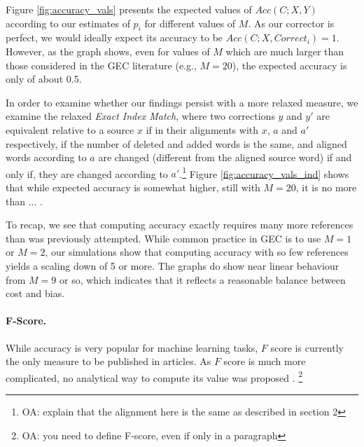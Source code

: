 \documentclass[english]{article}
\newcommand{\oa}[1]{\footnote{\color{red}OA: #1}}
\begin{document}
 Figure \ref{fig:accuracy_vals} presents the expected values of $Acc(C;X,Y)$ according to our estimates of $p_i$ for
 different values of $M$. As our corrector is perfect, we would ideally expect its accuracy to be
 $Acc(C;X,Correct_i) = 1$. However, as the graph shows, even for values of $M$ which are much larger than
 those considered in the GEC literature (e.g., $M=20$), the expected accuracy is only of about 0.5. 
 
 In order to examine whether our findings persist with a more relaxed measure, we examine the relaxed
 {\it Exact Index Match}, where two corrections $y$ and $y'$
 are equivalent relative to a source $x$ if in their alignments with $x$, $a$ and $a'$ respectively,
 if the number of deleted and added words is the same, and aligned words according to $a$ are
 changed (different from the aligned source word) if and only if, they are changed according to $a'$.\oa{
   explain that the alignment here is the same as described in section 2} Figure \ref{fig:accuracy_vals_ind}
 shows that while expected accuracy is somewhat higher, still with $M=20$, it is no more than ... .
 
 To recap, we see that computing accuracy exactly requires many more references than was previously attempted.
 While common practice in GEC is to use $M=1$ or $M=2$, our simulations show that computing accuracy with
 so few references yields a scaling down of 5 or more. The graphs do show near linear behaviour from $M=9$ or
 so, which indicates that it reflects a reasonable balance between cost and bias.
 
 \paragraph{F-Score.}

 While accuracy is very popular for machine learning tasks, $F$ score is currently the
 only measure to be published in articles. As $F$ score is much more complicated, no analytical way to
 compute its value was proposed \cite{yeh2000more}. \oa{you need to define F-score, even if only in a paragraph}
 
\end{document}
